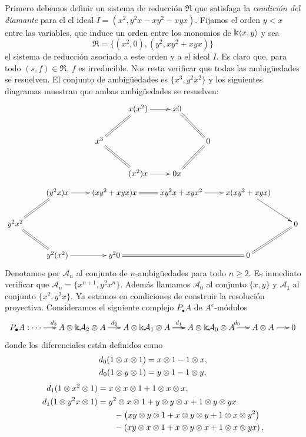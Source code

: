 \documentclass[fleqn,../tesis.tex]{subfiles}
\begin{document}
Primero debemos definir un sistema de reducción $\mathfrak{R}$ que satisfaga la \emph{condición del diamante}
para el el ideal $I = \left(x^2, y^2x - xy^2 - xyx\right)$. Fijamos el orden $y < x$ entre las variables, que induce un orden entre
los monomios de $\Bbbk\langle x, y\rangle$ y sea
\[
	\mathfrak{R} = \lbrace (x^2, 0), (y^2, xy^2 + xyx) \rbrace
\]
el sistema de reducción asociado a este orden y a el ideal $I$. Es claro que, para todo $(s, f) \in \mathfrak{R}$, $f$ es irreducible.
Nos resta verificar que todas las ambigüedades se resuelven. El conjunto de ambigüedades es $\lbrace x^3, y^2x^2 \rbrace$
y los siguientes diagramas muestran que ambas ambigüedades se resuelven:
\begin{align*}
\xymatrix{
 	& x(x^2) \ar[r]& x 0 \ar@{=}[dr]&\\
	x^3 \ar@{=}[ur] \ar@{=}[dr] & & & 0\\
	& (x^2)x \ar[r]& 0 x \ar@{=}[ur]&
}
\end{align*}
\begin{align*}
\xymatrix{
	& (y^2x)x \ar[r]& (xy^2 + xyx) x \ar@{=}[r]& xy^2x + xyx^2 \ar[r] & x(xy^2 + xyx) \ar[dr]&\\
	y^2x^2 \ar@{=}[ur] \ar@{=}[dr]& & & & & 0\\
	& y^2(x^2) \ar[r]& y^2 0 \ar@{=}[rr]& & 0 \ar@{=}[ur] &
}
\end{align*}
Denotamos por $\mathcal{A}_{n}$
al conjunto de $n$-ambigüedades para todo $n\geq 2$. Es inmediato verificar que $\mathcal{A}_{n} = \lbrace x^{n + 1}, y^{2}x^n\rbrace$.
Además llamamos $\mathcal{A}_0$
al conjunto $\lbrace x, y \rbrace$ y $\mathcal{A}_1$ al conjunto $\lbrace x^2, y^2x\rbrace$.
Ya estamos en condiciones de construir la resolución proyectiva. Consideramos
el siguiente complejo $P_{\bullet}A$ de $A^e$-módulos
\begin{align*}
\xymatrix@=1.5em{
	P_{\bullet}A: \cdots \ar[r]^{d_{3}} & A \ox \field \mathcal{A}_2 \ox A \ar[r]^{d_2}
		& A \ox \field \mathcal{A}_1 \ox A \ar[r]^{d_1} \ar[r]
		& A \ox \field \mathcal{A}_0 \ox A \ar[r]^{d_0} & A\ox A \ar[r] & 0
}
\end{align*}
donde los diferenciales están definidos como
\begin{align*}
	d_0(1\otimes x \otimes 1) &= x \otimes 1 - 1 \otimes x,\\
	d_0(1 \otimes y \otimes 1) &= y \otimes 1 - 1\otimes y,
\end{align*}
\begin{align*}
	d_1(1\otimes x^2 \otimes 1) &= x \otimes x \otimes 1 + 1 \otimes x \otimes x,\\
	d_1(1\otimes y^2x \otimes 1) &= y^2 \otimes x \otimes 1 + y \otimes y \otimes x  + 1 \otimes y \otimes yx\\
	&\qquad - \left(xy \otimes y \otimes 1 + x \otimes y \otimes y + 1 \otimes x \otimes y^2\right)\\
	&\qquad - \left(xy \otimes x \otimes 1 + x \otimes y \otimes x + 1 \otimes x \otimes yx\right),\\
\end{align*}
\end{document}
